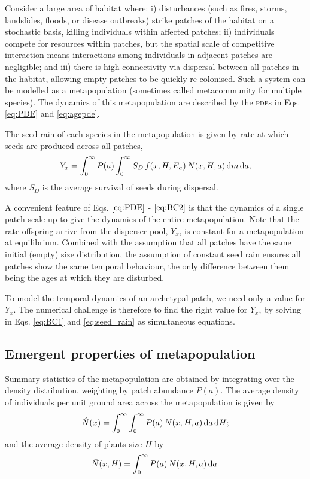 \documentclass[10pt,twoside]{article}
\begin{document}
Consider a large area of habitat where: i) disturbances (such as fires,
storms, landslides, floods, or disease outbreaks) strike patches of the
habitat on a stochastic basis, killing individuals within affected
patches; ii) individuals compete for resources within patches, but the
spatial scale of competitive interaction means interactions among
individuals in adjacent patches are negligible; and iii) there is high
connectivity via dispersal between all patches in the habitat, allowing
empty patches to be quickly re-colonised. Such a system can be modelled
as a metapopulation (sometimes called metacommunity for multiple
species). The dynamics of this metapopulation are described by the
\textsc{pde}s in Eqs. \ref{eq:PDE} and  \ref{eq:agepde}.

The seed rain of each species in the metapopulation is given by rate at
which seeds are produced across all patches,
\begin{equation}  \label{eq:seed_rain}
  Y_x = \int_0^{\infty} P(a)  \int_0^{\infty} S_D \, f(x, H, E_a) \, N(x, H, a) \, {\rm d} m \, {\rm d} a,
\end{equation}
where \(S_D\) is the average survival of seeds during dispersal.

A convenient feature of Eqs. \(\ref{eq:PDE}\) - \(\ref{eq:BC2}\) is that
the dynamics of a single patch scale up to give the dynamics of the
entire metapopulation. Note that the rate offspring arrive from the
disperser pool, \(Y_x\), is constant for a metapopulation at
equilibrium. Combined with the assumption that all patches have the same
initial (empty) size distribution, the assumption of constant seed rain
ensures all patches show the same temporal behaviour, the only
difference between them being the ages at which they are disturbed.

To model the temporal dynamics of an archetypal patch, we need only a
value for \(Y_x\). The numerical challenge is therefore to find the
right value for \(Y_x\), by solving in Eqs. \ref{eq:BC1} and
\ref{eq:seed_rain} as simultaneous equations.

\subsection{Emergent properties of
metapopulation}\label{emergent-properties-of-metapopulation}

Summary statistics of the metapopulation are obtained by integrating
over the density distribution, weighting by patch abundance \(P(a)\).
The average density of individuals per unit ground area across the metapopulation is given by
\begin{equation}
  \hat{N}(x) = \int_{0}^{\infty} \int_{0}^{\infty}P(a) \, N(x, H, a) \, {\rm d}a \, {\rm d}H;
\end{equation}
and the average density of plants size \(H\) by
\begin{equation}
  \bar{N}(x, H) = \int_{0}^{\infty}P(a) \, N(x, H, a) \, {\rm d}a.
\end{equation}
\end{document}
